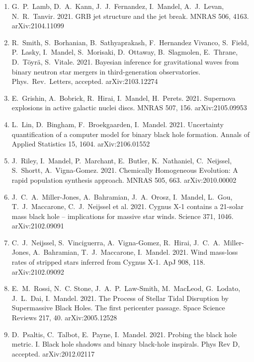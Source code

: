 \documentclass[margin,line]{res}
\begin{document}
\begin{resume}
\begin{enumerate}
\item G.~P.~Lamb, D.~A.~Kann, J.~J.~Fernandez, I.~Mandel, A.~J.~Levan, N.~R.~Tanvir. 2021. GRB jet structure and the jet break. MNRAS 506, 4163.  arXiv:2104.11099

\item R.~Smith, S.~Borhanian, B.~Sathyaprakash, F.~Hernandez Vivanco, S.~Field, P.~Lasky, I.~Mandel, S.~Morisaki, D.~Ottaway, B.~Slagmolen, E.~Thrane, D.~T\"{o}yr\"{a}, S.~Vitale.  2021.  Bayesian inference for gravitational waves from binary neutron star mergers in third-generation observatories.  Phys.~Rev.~Letters, accepted. arXiv:2103.12274

\item E.~Grishin, A.~Bobrick, R.~Hirai, I.~Mandel, H.~Perets. 2021.  Supernova explosions in active galactic nuclei discs.  MNRAS 507, 156.  arXiv:2105.09953

\item L.~Lin, D.~Bingham, F.~Broekgaarden, I.~Mandel. 2021. Uncertainty quantification of a computer model for binary black hole formation. Annals of Applied Statistics 15, 1604.  arXiv:2106.01552 

\item J.~Riley, I.~Mandel, P.~Marchant, E.~Butler, K.~Nathaniel, C.~Neijssel, S.~Shortt, A.~Vigna-Gomez.  2021. Chemically Homogeneous Evolution: A rapid population synthesis approach. MNRAS 505, 663.  arXiv:2010.00002

\item J.~C.~A.~Miller-Jones, A.~Bahramian, J.~A.~Orosz, I.~Mandel, L.~Gou, T.~J.~Maccarone, C.~J.~Neijssel et al.  2021.  Cygnus X-1 contains a 21-solar mass black hole -- implications for massive star winds.  Science 371, 1046. arXiv:2102.09091

\item C.~J.~Neijssel, S.~Vinciguerra, A.~Vigna-Gomez, R.~Hirai, J.~C.~A.~Miller-Jones, A.~Bahramian, T.~J.~Maccarone, I.~Mandel.  2021.  Wind mass-loss rates of stripped stars inferred from Cygnus X-1. ApJ 908, 118.  arXiv:2102.09092

\item E.~M.~Rossi, N.~C. Stone, J.~A.~P.~Law-Smith, M.~MacLeod, G.~Lodato, J.~L.~Dai, I.~Mandel.  2021.  The Process of Stellar Tidal Disruption by Supermassive Black Holes. The first pericenter passage.  Space Science Reviews 217, 40.  arXiv:2005.12528

\item D.~Psaltis, C.~Talbot, E.~Payne, I.~Mandel.  2021. Probing the black hole metric. I. Black hole shadows and binary black-hole inspirals.  Phys Rev D, accepted. arXiv:2012.02117


\end{enumerate}
\end{resume}
\end{document}
